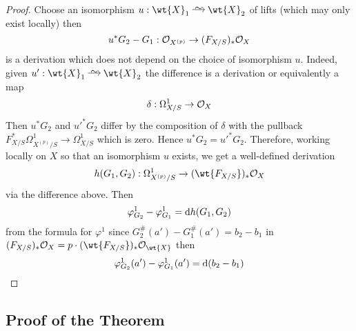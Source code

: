\documentclass[12pt]{article}
\begin{document}
\begin{proof}
Choose an isomorphism $u : \wt{X}_1 \iso \wt{X}_2$ of lifts (which may only exist locally) then 
\[ u^* G_2 - G_1 : \mathcal{O}_{X^{(p)}} \to (F_{X/S})_* \mathcal{O}_{X} \]
is a derivation which does not depend on the choice of isomorphism $u$. Indeed, given $u' : \wt{X}_1 \iso \wt{X}_2$ the difference is a derivation or equivalently a map
\[ \delta : \Omega_{X/S}^1 \to \mathcal{O}_{X} \]
Then $u^* G_2$ and $u'^* G_2$ differ by the composition of $\delta$ with the pullback $F^*_{X/S} \Omega^1_{X^{(p)}/S} \to \Omega^1_{X/S}$ which is zero. Hence $u^* G_2 = u'^* G_2$. Therefore, working locally on $X$ so that an isomorphism $u$ exists, we get a well-defined derivation 
\[ h(G_1, G_2) : \Omega^1_{X^{(p)}/S} \to (\wt{F_{X/S}})_* \struct{X} \]
via the difference above. Then 
\[ \varphi_{G_2}^1 - \varphi_{G_1}^1 = \mathrm{d}{h(G_1, G_2)} \]
from the formula for $\varphi^1$ since $G_2^{\#}(a') - G_1^{\#}(a') = b_2 - b_1$ in $(F_{X/S})_* \struct{X} = p \cdot (\wt{F_{X/S}})_* \struct{\wt{X}}$ then
\[ \varphi^1_{G_2}(a') - \varphi^1_{G_1}(a') = \mathrm{d}{(b_2 - b_1)} \]
\end{proof}

\subsection{Proof of the Theorem}
\end{document}
